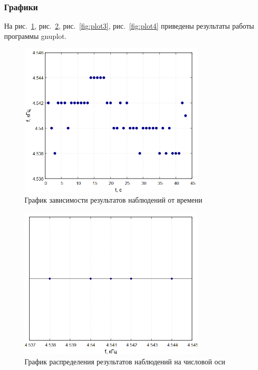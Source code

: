 \subsubsection{Графики}

На рис.~\ref{fig:plot1}, рис.~\ref{fig:plot2}, рис.~\ref{fig:plot3}, рис.~\ref{fig:plot4} приведены результаты работы программы gnuplot.

\begin{figure}
\centering
\includegraphics[width=0.8\textwidth]{Plot1.png}
\caption{График зависимости результатов наблюдений от времени}
\label{fig:plot1}
\end{figure}

\begin{figure}
\centering
\includegraphics[width=0.8\textwidth]{Plot2.png}
\caption{График распределения результатов наблюдений на числовой оси}
\label{fig:plot2}
\end{figure}

